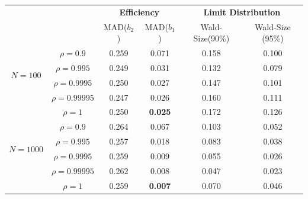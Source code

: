 \documentclass{beamer}
\begin{document}
\begin{frame}

 \begin{table}[ht]
\begin{center}
\tiny

\begin{tabular}{|cc|cc|cc|}

\hline
& & \multicolumn{2}{c|}{\textbf{Efficiency}} & \multicolumn{2}{c|}{\textbf{Limit Distribution }}  \\

& & \multicolumn{1}{c}{MAD($b_2$)}& \multicolumn{1}{c|}{MAD($b_1$)}
 &   \multicolumn{1}{c}{Wald-Size(90\%)}
                & \multicolumn{1}{c|}{Wald-Size (95\%)}
\\ \hline

  \multirow{4}{*}{\begin{sideways}\parbox{2cm}{\centering $N=100$}\end{sideways}}



&\hspace{-0.8cm}$\rho=0.9$      &0.259  &0.071  &0.158 &0.100       \\  [0.18cm]
&\hspace{-0.85cm}$\rho=0.995$   &0.249  &0.031   &0.132 &0.079      \\ [0.18cm]
&\hspace{-0.6cm}$\rho=0.9995$   &0.250  &0.027   &0.147 &0.101       \\  [0.18cm]
&\hspace{-0.40cm}$\rho=0.99995$ &0.247  &0.026   &0.160 &0.111        \\ [0.18cm]
&\hspace{-1.0cm}$\rho=1 $       &0.250  &\textbf{0.025}   &0.172 &0.126        \\ [0.18cm]

  \hline

  \multirow{4}{*}{\begin{sideways}\parbox{2cm}{\centering $N=1000$}\end{sideways}}

 &\hspace{-0.8cm} $\rho=0.9$         &0.264  &0.067   &0.103  &0.052    \\  [0.18cm]
 &\hspace{-0.85cm} $\rho=0.995$      &0.257  &0.018   &0.083  &0.038   \\ [0.18cm]
 &\hspace{-0.6cm} $\rho=0.9995$      &0.259  &0.009   &0.055  &0.026     \\  [0.18cm]
 &\hspace{-0.40cm} $\rho=0.99995$    &0.262  &0.008   &0.047  &0.023       \\ [0.18cm]
 &\hspace{-1.0cm} $\rho=1 $          &0.259  &\textbf{0.007}   &0.070  &0.046      \\ [0.18cm]
  \hline


\end{tabular}
\end{center}
\end{table}
\end{frame}
\end{document}
